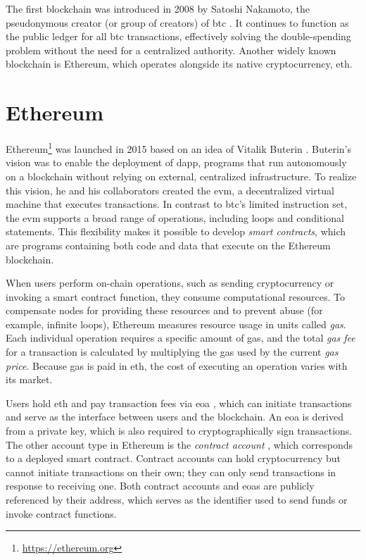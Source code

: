 The first blockchain was introduced in 2008 by Satoshi Nakamoto, the pseudonymous creator (or group of creators) of \gls{btc} \cite{nakamoto2008bitcoin}\cite{sasson2014zerocash}. It continues to function as the public ledger for all \gls{btc} transactions, effectively solving the \gls{double-spending} problem without the need for a centralized authority. Another widely known blockchain is Ethereum, which operates alongside its native cryptocurrency, \gls{eth}.

\section{Ethereum}
Ethereum\footnote{\url{https://ethereum.org}} was launched in 2015 based on an idea of Vitalik Buterin \cite{buterin2014next}\cite{wood2014ethereum}. Buterin's vision was to enable the deployment of \gls{dapp}, programs that run autonomously on a blockchain without relying on external, centralized infrastructure. To realize this vision, he and his collaborators created the \gls{evm}, a decentralized virtual machine that executes transactions. In contrast to \gls{btc}'s limited instruction set, the \gls{evm} supports a broad range of operations, including loops and conditional statements. This flexibility makes it possible to develop \textit{smart contracts}, which are programs containing both code and data that execute on the Ethereum blockchain.

When users perform on-chain operations, such as sending cryptocurrency or invoking a smart contract function, they consume computational resources. To compensate nodes for providing these resources and to prevent abuse (for example, infinite loops), Ethereum measures resource usage in units called \textit{gas}. Each individual operation requires a specific amount of gas, and the total \textit{gas fee} for a transaction is calculated by multiplying the gas used by the current \textit{gas price}. Because gas is paid in \gls{eth}, the cost of executing an operation varies with its market.

Users hold \gls{eth} and pay transaction fees via \gls{eoa} \cite{buterin2016ethereum}, which can initiate transactions and serve as the interface between users and the blockchain. An \gls{eoa} is derived from a private key, which is also required to cryptographically sign transactions. The other account type in Ethereum is the \textit{contract account} \cite{buterin2016ethereum}, which corresponds to a deployed smart contract. Contract accounts can hold cryptocurrency but cannot initiate transactions on their own; they can only send transactions in response to receiving one. Both contract accounts and \glspl{eoa} are publicly referenced by their address, which serves as the identifier used to send funds or invoke contract functions.


